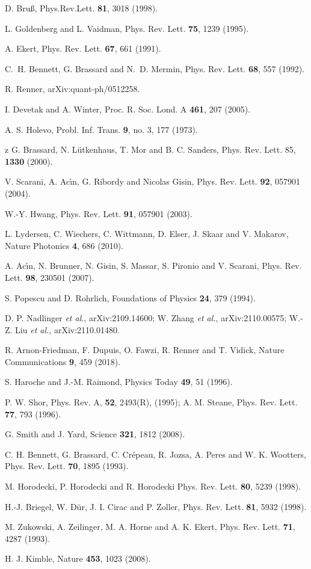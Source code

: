 \documentclass[a4paper]{article}
\begin{document}
\begin{thebibliography}{99}
D. Bru\ss{}, Phys.Rev.Lett. \textbf{81}, 3018  (1998).

L. Goldenberg and L. Vaidman, Phys. Rev. Lett. \textbf{75}, 1239 (1995).

A. Ekert, Phys. Rev. Lett. \textbf{67}, 661 (1991).

C.~H. Bennett, G. Brassard and N.~D. Mermin, Phys. Rev. Lett. \textbf{68}, 557 (1992).

R. Renner, arXiv:quant-ph/0512258.

I. Devetak and A. Winter, Proc. R. Soc. Lond. A  \textbf{461}, 207 (2005).

A. S. Holevo, Probl. Inf. Trans. {\bf 9}, no. 3, 177 (1973).

z
G. Brassard, N. L\"utkenhaus, T. Mor and B. C. Sanders, Phys. Rev. Lett. 85, \textbf{1330} (2000).

V. Scarani, A. Ac\'\i n, G. Ribordy and Nicolas Gisin, Phys. Rev. Lett. \textbf{92}, 057901 (2004).

W.-Y. Hwang, Phys. Rev. Lett. \textbf{91}, 057901 (2003).

L. Lydersen, C. Wiechers, C. Wittmann, D. Elser, J. Skaar and V. Makarov, 
Nature Photonics \textbf{4}, 686 (2010).

A. Ac\'\i n, N. Brunner, N. Gisin, S. Massar, S. Pironio and V. Scarani, Phys. Rev. Lett. \textbf{98}, 230501 (2007).

S. Popescu and D. Rohrlich, Foundations of Physics \textbf{24}, 379  (1994).

D. P. Nadlinger \textit{et al.}, arXiv:2109.14600; W. Zhang \textit{et al.}, arXiv:2110.00575; W.-Z. Liu \textit{et al.}, arXiv:2110.01480.

R. Arnon-Friedman, F. Dupuis, O. Fawzi, R. Renner and T. Vidick, Nature Communications \textbf{9}, 459 (2018).

S. Haroche and J.-M. Raimond, Physics Today \textbf{49}, 51 (1996).

P. W. Shor, Phys. Rev. A, {\bf 52}, 2493(R), (1995); A. M. Steane,
Phys. Rev. Lett. {\bf 77}, 793 (1996).

G. Smith and J. Yard, Science \textbf{321}, 1812 (2008).

C. H. Bennett, G. Brassard, C. Cr\'epeau, R. Jozsa, A. Peres and W.
K. Wootters, Phys. Rev. Lett. {\bf 70}, 1895 (1993).

M. Horodecki, P. Horodecki and R. Horodecki Phys. Rev. Lett. {\bf
80}, 5239 (1998).

H.-J. Briegel, W. D\"ur, J. I. Cirac and P. Zoller, Phys. Rev. Lett. \textbf{81}, 5932 (1998).

M. Zukowski, A. Zeilinger, M. A. Horne and A. K. Ekert, Phys. Rev. Lett. \textbf{71}, 4287 (1993).

H. J. Kimble, Nature \textbf{453}, 1023 (2008).


\end{thebibliography}
\end{document}
